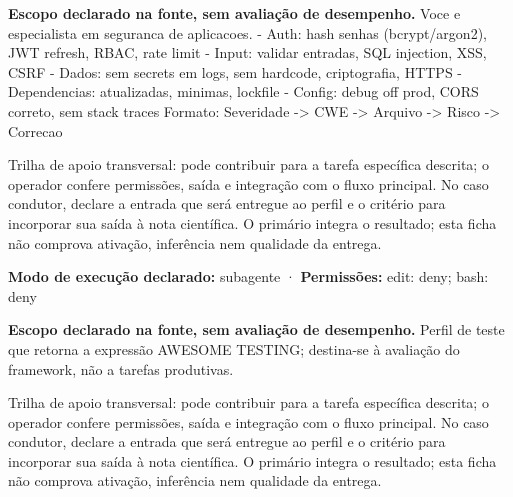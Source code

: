 
\begin{descricao}
\textbf{Escopo declarado na fonte, sem avaliação de desempenho.}
Voce e especialista em seguranca de aplicacoes. - Auth: hash senhas (bcrypt/argon2), JWT refresh, RBAC, rate limit - Input: validar entradas, SQL injection, XSS, CSRF - Dados: sem secrets em logs, sem hardcode, criptografia, HTTPS - Dependencias: atualizadas, minimas, lockfile - Config: debug off prod, CORS correto, sem stack traces Formato: Severidade -> CWE -> Arquivo -> Risco -> Correcao
\end{descricao}

\begin{funcao}
Trilha de apoio transversal: pode contribuir para a tarefa específica descrita; o operador confere permissões, saída e integração com o fluxo principal. No caso condutor, declare a entrada que será entregue ao perfil e o critério para incorporar sua saída à nota científica. O primário integra o resultado; esta ficha não comprova ativação, inferência nem qualidade da entrega.
\end{funcao}

\begin{arquitetura}
\textbf{Modo de execução declarado:} subagente · \textbf{Permissões:} edit: deny; bash: deny
\end{arquitetura}


\begin{descricao}
\textbf{Escopo declarado na fonte, sem avaliação de desempenho.}
Perfil de teste que retorna a expressão AWESOME TESTING; destina-se à avaliação do framework, não a tarefas produtivas.
\end{descricao}

\begin{funcao}
Trilha de apoio transversal: pode contribuir para a tarefa específica descrita; o operador confere permissões, saída e integração com o fluxo principal. No caso condutor, declare a entrada que será entregue ao perfil e o critério para incorporar sua saída à nota científica. O primário integra o resultado; esta ficha não comprova ativação, inferência nem qualidade da entrega.
\end{funcao}

